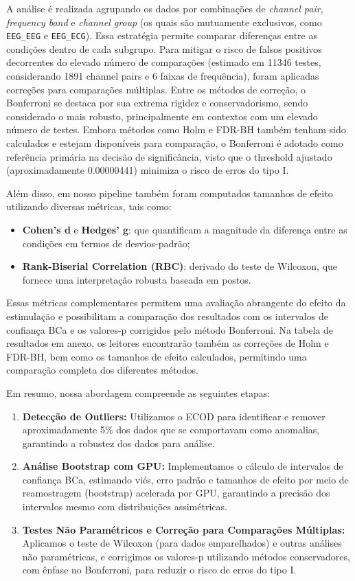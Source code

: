 A análise é realizada agrupando os dados por combinações de \emph{channel pair}, \emph{frequency band} e \emph{channel group} (os quais são mutuamente exclusivos, como \texorpdfstring{\texttt{EEG\_EEG}}{EEG_EEG} e \texorpdfstring{\texttt{EEG\_ECG}}{EEG_ECG}). Essa estratégia permite comparar diferenças entre as condições dentro de cada subgrupo. Para mitigar o risco de falsos positivos decorrentes do elevado número de comparações (estimado em 11346 testes, considerando 1891 channel pairs e 6 faixas de frequência), foram aplicadas correções para comparações múltiplas. Entre os métodos de correção, o Bonferroni se destaca por sua extrema rigidez e conservadorismo, sendo considerado o mais robusto, principalmente em contextos com um elevado número de testes. Embora métodos como Holm e FDR-BH também tenham sido calculados e estejam disponíveis para comparação, o Bonferroni é adotado como referência primária na decisão de significância, visto que o threshold ajustado (aproximadamente 0.00000441) minimiza o risco de erros do tipo I.

Além disso, em nosso pipeline também foram computados tamanhos de efeito utilizando diversas métricas, tais como:
\begin{itemize}
    \item \textbf{Cohen's d} e \textbf{Hedges' g}: que quantificam a magnitude da diferença entre as condições em termos de desvios-padrão;
    \item \textbf{Rank-Biserial Correlation (RBC)}: derivado do teste de Wilcoxon, que fornece uma interpretação robusta baseada em postos.
\end{itemize}
Essas métricas complementares permitem uma avaliação abrangente do efeito da estimulação e possibilitam a comparação dos resultados com os intervalos de confiança BCa e os valores-p corrigidos pelo método Bonferroni. Na tabela de resultados em anexo, os leitores encontrarão também as correções de Holm e FDR-BH, bem como os tamanhos de efeito calculados, permitindo uma comparação completa dos diferentes métodos.

Em resumo, nossa abordagem compreende as seguintes etapas:
\begin{enumerate}
    \item \textbf{Detecção de Outliers:} Utilizamos o ECOD para identificar e remover aproximadamente 5\% dos dados que se comportavam como anomalias, garantindo a robustez dos dados para análise.
    \item \textbf{Análise Bootstrap com GPU:} Implementamos o cálculo de intervalos de confiança BCa, estimando viés, erro padrão e tamanhos de efeito por meio de reamostragem (bootstrap) acelerada por GPU, garantindo a precisão dos intervalos mesmo com distribuições assimétricas.
    \item \textbf{Testes Não Paramétricos e Correção para Comparações Múltiplas:} Aplicamos o teste de Wilcoxon (para dados emparelhados) e outras análises não paramétricas, e corrigimos os valores-p utilizando métodos conservadores, com ênfase no Bonferroni, para reduzir o risco de erros do tipo I.
\end{enumerate}


